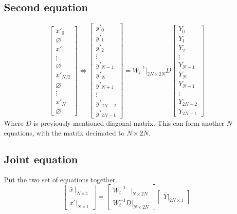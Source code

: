 \documentclass[12pt]{article}
\begin{document}
\subsection{Second equation}
\begin{equation}
    \begin{bmatrix}
        x'_0 \\ \varnothing \\ x'_1 \\ \vdots \\ \varnothing \\ x'_{N/2} \\ \varnothing \\ \vdots \\ x'_N \\ \varnothing
    \end{bmatrix}
\Leftrightarrow
    \begin{bmatrix}
        y'_0 \\ y'_1 \\ y'_2 \\ \vdots \\ y'_{N-1} \\ y'_N \\ y'_{N+1} \\ \vdots \\ y'_{2N-2} \\ y'_{2N-1}
    \end{bmatrix}
= W_t^{-1}|_{2N\times 2N} D
    \begin{bmatrix}
        Y_0 \\ Y_1 \\ Y_2 \\ \vdots \\ Y_{N-1} \\Y_N \\ Y_{N+1} \\ \vdots \\ Y_{2N-2} \\ Y_{2N-1} 
    \end{bmatrix}
\end{equation}
Where $D$ is previously mentioned diagonal matrix. 
This can form another $N$ equations, with the matrix decimated to $N\times 2N$.

\subsection{Joint equation}
Put the two set of equations together.
\begin{equation}
    \begin{bmatrix}
        \bar{x}~|_{N\times 1} \\
        \bar{x'}|_{N\times 1}
    \end{bmatrix}
    =
    \begin{bmatrix}
        W_t^{-1}~~~|_{N\times 2N} \\
        W_t^{-1} D|_{N\times 2N}  
    \end{bmatrix}
    \begin{bmatrix}
        \bar{Y}|_{2N\times 1}
    \end{bmatrix}
\end{equation}
\end{document}
